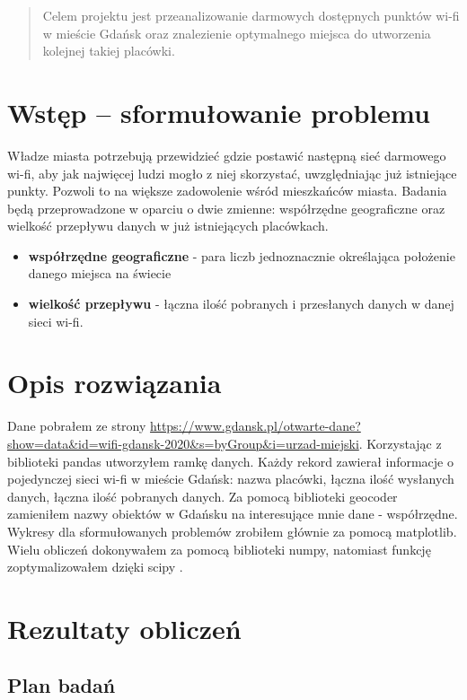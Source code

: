 \documentclass[10pt]{article}
\begin{document}


\begin{abstract}
Celem projektu jest przeanalizowanie darmowych dostępnych punktów wi-fi w mieście Gdańsk oraz znalezienie optymalnego miejsca do utworzenia kolejnej takiej placówki.  
\end{abstract}

\section{Wstęp -- sformułowanie problemu}
\label{sec:wstep}

Władze miasta potrzebują przewidzieć gdzie postawić następną sieć darmowego wi-fi, aby jak najwięcej ludzi mogło z niej skorzystać, uwzględniając już istniejące punkty. Pozwoli to na większe zadowolenie wśród mieszkańców miasta. Badania będą przeprowadzone w oparciu o dwie zmienne: współrzędne geograficzne oraz wielkość przepływu danych w już istniejących placówkach.  

\begin{itemize}
    \item \textbf{współrzędne geograficzne} - para liczb jednoznacznie określająca położenie danego miejsca na świecie
    \item \textbf{wielkość przepływu} - łączna ilość pobranych i przesłanych danych w danej sieci wi-fi.   
\end{itemize}

\section{Opis rozwiązania} 
 Dane pobrałem ze strony \url{https://www.gdansk.pl/otwarte-dane?show=data&id=wifi-gdansk-2020&s=byGroup&i=urzad-miejski}. Korzystając z biblioteki pandas utworzyłem ramkę danych. Każdy rekord zawierał informacje o pojedynczej sieci wi-fi w mieście Gdańsk: nazwa placówki, łączna ilość wysłanych danych, łączna ilość pobranych danych. Za pomocą biblioteki geocoder zamieniłem nazwy obiektów w Gdańsku na interesujące mnie dane - współrzędne. Wykresy dla sformułowanych problemów zrobiłem głównie  za pomocą matplotlib. Wielu obliczeń dokonywałem za pomocą biblioteki numpy, natomiast funkcję zoptymalizowałem dzięki scipy . 

\section{Rezultaty obliczeń}

\subsection{Plan badań}
\end{document}
